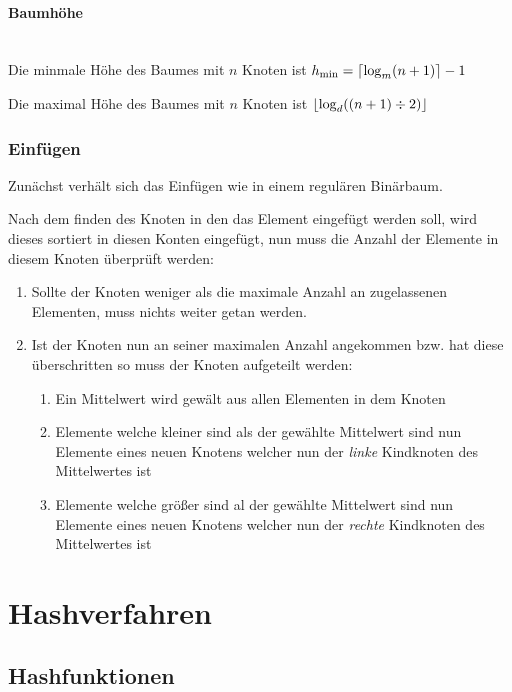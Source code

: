 \documentclass[10pt,a4paper]{article}
\begin{document}
\begin{multicols*}{4}
\paragraph*{Baumhöhe}\hfill\\
Die minmale Höhe des Baumes mit \(n\) Knoten ist \(h_{\text{min}} = \lceil\log_{m}(n+1)\rceil - 1\)

Die maximal Höhe des Baumes mit \(n\) Knoten ist \(\lfloor\log_{d}((n+1) \div 2)\rfloor\)

\subsubsection{Einfügen}
Zunächst verhält sich das Einfügen wie in einem regulären Binärbaum.

Nach dem finden des Knoten in den das Element eingefügt werden soll, wird dieses sortiert in diesen Konten eingefügt,
nun muss die Anzahl der Elemente in diesem Knoten überprüft werden:
\begin{enumerate}
	\item Sollte der Knoten weniger als die maximale Anzahl an zugelassenen Elementen, muss nichts weiter getan werden.
	\item Ist der Knoten nun an seiner maximalen Anzahl angekommen bzw. hat diese überschritten so muss der Knoten
	      aufgeteilt werden:
	      \begin{enumerate}
		      \item Ein Mittelwert wird gewält aus allen Elementen in dem Knoten
		      \item Elemente welche kleiner sind als der gewählte Mittelwert sind nun Elemente eines neuen Knotens
		            welcher nun der \textit{linke} Kindknoten des Mittelwertes ist
		      \item Elemente welche größer sind al der gewählte Mittelwert sind nun Elemente eines neuen Knotens welcher
		            nun der \textit{rechte} Kindknoten des Mittelwertes ist
	      \end{enumerate}
\end{enumerate}

\section{Hashverfahren}

\subsection{Hashfunktionen}


\end{multicols*}
\end{document}
